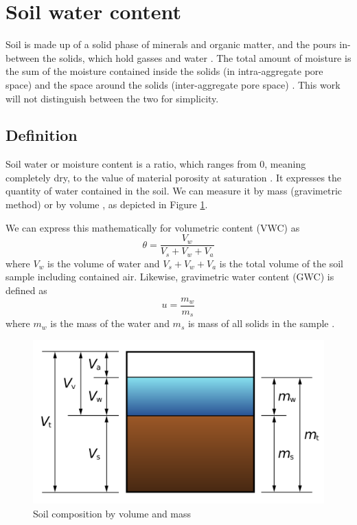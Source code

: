
\section{Soil water content}

Soil is made up of a solid phase of minerals and organic matter, and the pours in-between the solids, which hold gasses and water \cite{paul_soil_2007}. The total amount of moisture is the sum of the moisture contained inside the solids (in intra-aggregate pore space) and the space around the solids (inter-aggregate pore space) \cite{myjove_corporation_determination_2024}. This work will not distinguish between the two for simplicity.

\subsection{Definition}
Soil water or moisture content is a ratio, which ranges from 0, meaning completely dry, to the value of material porosity at saturation \cite{webster_humidity_1998}. It expresses the quantity of water contained in the soil. We can measure it by mass (gravimetric method) or by volume , as depicted in Figure \ref{fig:soil-phase-diagram}.

We can express this mathematically for volumetric content (VWC) as
\begin{equation}
    \label{equation:volumetric-content} \theta = \dfrac{V_w}{V_s + V_w + V_a}
\end{equation}
where $V_w$ is the volume of water and $V_s + V_w + V_a$ is the total volume of the soil sample including contained air. Likewise, gravimetric water content (GWC) is defined as
\begin{equation}
    \label{equation:gravimetric-content} u = \dfrac{m_w}{m_s}
\end{equation}
where $m_w$ is the mass of the water and $m_s$ is mass of all solids in the sample \cite{edaphic_scientific_pty_ltd_how_2024}.

\begin{figure}
    \includegraphics[width=.5\textwidth]{fig/soil-phase-diagram.png}
    \caption{\label{fig:soil-phase-diagram} Soil composition by volume and mass}
\end{figure}

